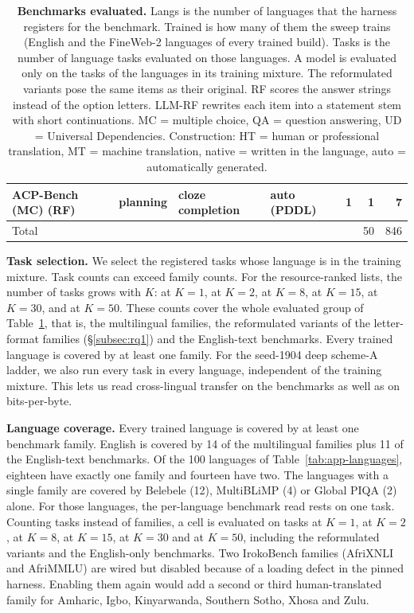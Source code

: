 \begin{table}[t]
{\begin{tabular}{llllrrr}
ACP-Bench (MC) (RF) & planning & cloze completion & auto (PDDL) & 1 & 1 & 7 \\
\midrule
Total & & & & & 50 & 846 \\
\bottomrule
\end{tabular}
}
\caption{\textbf{Benchmarks evaluated.} Langs is the number of languages that the harness registers for the benchmark. Trained is how many of them the sweep trains (English and the FineWeb-2 languages of every trained build). Tasks is the number of language tasks evaluated on those languages. A model is evaluated only on the tasks of the languages in its training mixture. The reformulated variants pose the same items as their original. RF scores the answer strings instead of the option letters. LLM-RF rewrites each item into a statement stem with short continuations. MC = multiple choice, QA = question answering, UD = Universal Dependencies. Construction: HT = human or professional translation, MT = machine translation, native = written in the language, auto = automatically generated.}
\label{tab:benchmark-families}
\end{table}

\textbf{Task selection.} We select the registered tasks whose language is in the training mixture. Task counts can exceed family counts. For the resource-ranked lists, the number of tasks grows with $K$: \ntasksKone at $K=1$, \ntasksKtwo at $K=2$, \ntasksKeight at $K=8$, \ntasksKfifteen at $K=15$, \ntasksKthirty at $K=30$, and \ntasksKfifty at $K=50$. These counts cover the whole evaluated group of Table~\ref{tab:benchmark-families}, that is, the multilingual families, the reformulated variants of the letter-format families (\S\ref{subsec:rq1}) and the English-text benchmarks. Every trained language is covered by at least one family. For the seed-1904 deep scheme-A ladder, we also run every task in every language, independent of the training mixture. This lets us read cross-lingual transfer on the benchmarks as well as on bits-per-byte. 

\textbf{Language coverage.} Every trained language is covered by at least one benchmark family. English is covered by 14 of the multilingual families plus 11 of the English-text benchmarks. Of the 100 languages of Table~\ref{tab:app-languages}, eighteen have exactly one family and fourteen have two. The languages with a single family are covered by Belebele (12), MultiBLiMP (4) or Global PIQA (2) alone. For those languages, the per-language benchmark read rests on one task. Counting tasks instead of families, a cell is evaluated on \ntasksKone tasks at $K=1$, \ntasksKtwo at $K=2$, \ntasksKeight at $K=8$, \ntasksKfifteen at $K=15$, \ntasksKthirty at $K=30$ and \ntasksKfifty at $K=50$, including the reformulated variants and the English-only benchmarks. Two IrokoBench families (AfriXNLI and AfriMMLU) are wired but disabled because of a loading defect in the pinned harness. Enabling them again would add a second or third human-translated family for Amharic, Igbo, Kinyarwanda, Southern Sotho, Xhosa and Zulu.


